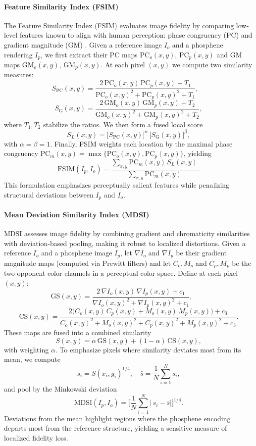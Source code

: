 \paragraph{Feature Similarity Index (FSIM)}  
The Feature Similarity Index (FSIM) evaluates image fidelity by comparing low‐level features known to align with human perception: phase congruency (PC) and gradient magnitude (GM) \cite{Zhang2011}.  Given a reference image \(I_o\) and a phosphene rendering \(I_p\), we first extract their PC maps \(\mathrm{PC}_o(x,y)\), \(\mathrm{PC}_p(x,y)\) and GM maps \(\mathrm{GM}_o(x,y)\), \(\mathrm{GM}_p(x,y)\).  At each pixel \((x,y)\) we compute two similarity measures:
\[
S_{\mathrm{PC}}(x,y)
= \frac{2\,\mathrm{PC}_o(x,y)\,\mathrm{PC}_p(x,y) + T_1}
       {\mathrm{PC}_o(x,y)^2 + \mathrm{PC}_p(x,y)^2 + T_1},
\quad
\]
\[
S_{\mathrm{G}}(x,y)
= \frac{2\,\mathrm{GM}_o(x,y)\,\mathrm{GM}_p(x,y) + T_2}
       {\mathrm{GM}_o(x,y)^2 + \mathrm{GM}_p(x,y)^2 + T_2},
\]
where \(T_1,T_2\) stabilize the ratios.  We then form a fused local score
\[
S_L(x,y)
= \bigl[S_{\mathrm{PC}}(x,y)\bigr]^\alpha\,
  \bigl[S_{\mathrm{G}}(x,y)\bigr]^\beta,
\]
with \(\alpha=\beta=1\).  Finally, FSIM weights each location by the maximal phase congruency  
\(\mathrm{PC}_m(x,y)=\max\{\mathrm{PC}_o(x,y),\mathrm{PC}_p(x,y)\}\), yielding
\[
\mathrm{FSIM}(I_p,I_o)
= \frac{\sum_{x,y}\mathrm{PC}_m(x,y)\,S_L(x,y)}
       {\sum_{x,y}\mathrm{PC}_m(x,y)}.
\]
This formulation emphasizes perceptually salient features while penalizing structural deviations between \(I_p\) and \(I_o\).


\paragraph{Mean Deviation Similarity Index (MDSI)}  
MDSI \cite{ZiaeiNafchi2016} assesses image fidelity by combining gradient and chromaticity similarities with deviation‐based pooling, making it robust to localized distortions.  Given a reference \(I_o\) and a phosphene image \(I_p\), let \(\nabla I_o\) and \(\nabla I_p\) be their gradient magnitude maps (computed via Prewitt filters) and let \(C_o, M_o\) and \(C_p, M_p\) be the two opponent color channels in a perceptual color space.  Define at each pixel \((x,y)\):  
\[
\mathrm{GS}(x,y)
= \frac{2\,\nabla I_o(x,y)\,\nabla I_p(x,y) + c_1}
       {\nabla I_o(x,y)^2 + \nabla I_p(x,y)^2 + c_1},
\qquad
\]
\[
\mathrm{CS}(x,y)
= \frac{2\bigl(C_o(x,y)\,C_p(x,y) + M_o(x,y)\,M_p(x,y)\bigr) + c_3}
       {C_o(x,y)^2 + M_o(x,y)^2 + C_p(x,y)^2 + M_p(x,y)^2 + c_3}.
\]
These maps are fused into a combined similarity
\[
S(x,y)
= \alpha\,\mathrm{GS}(x,y) + (1-\alpha)\,\mathrm{CS}(x,y),
\]
with weighting \(\alpha\).  To emphasize pixels where similarity deviates most from its mean, we compute  
\[
s_i = S(x_i,y_i)^{1/4}, 
\quad
\bar s = \frac{1}{N}\sum_{i=1}^N s_i,
\]
and pool by the Minkowski deviation
\[
\mathrm{MDSI}(I_p,I_o)
= \biggl[\frac{1}{N}\sum_{i=1}^N \bigl|\,s_i - \bar s\bigr|\biggr]^{1/4}.
\]
Deviations from the mean highlight regions where the phosphene encoding departs most from the reference structure, yielding a sensitive measure of localized fidelity loss.  
 

